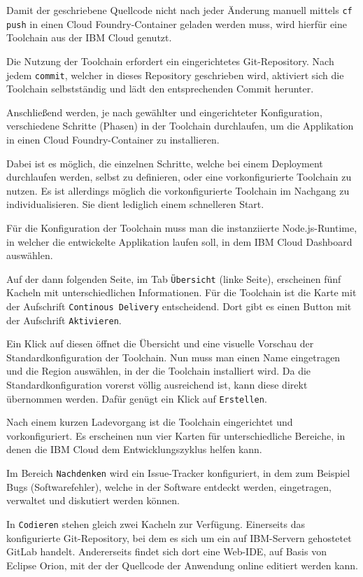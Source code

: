 Damit der geschriebene Quellcode nicht nach jeder Änderung manuell mittels \texttt{cf push} in einen Cloud
Foundry-Container geladen werden muss, wird hierfür eine Toolchain aus der IBM Cloud genutzt.

Die Nutzung der Toolchain erfordert ein eingerichtetes Git-Repository. Nach jedem \texttt{commit}, welcher in dieses
Repository geschrieben wird, aktiviert sich die Toolchain selbstständig und lädt den entsprechenden Commit herunter.

Anschließend werden, je nach gewählter und eingerichteter Konfiguration, verschiedene Schritte (Phasen) in der Toolchain
durchlaufen, um die Applikation in einen Cloud Foundry-Container zu installieren.

Dabei ist es möglich, die einzelnen Schritte, welche bei einem Deployment durchlaufen werden, selbst zu definieren, oder
eine vorkonfigurierte Toolchain zu nutzen. Es ist allerdings möglich die vorkonfigurierte Toolchain im Nachgang zu
individualisieren. Sie dient lediglich einem schnelleren Start.

Für die Konfiguration der Toolchain muss man die instanziierte Node.js-Runtime, in welcher die entwickelte Applikation
laufen soll, in dem IBM Cloud Dashboard auswählen.

Auf der dann folgenden Seite, im Tab \texttt{Übersicht} (linke Seite), erscheinen fünf Kacheln mit unterschiedlichen
Informationen. Für die Toolchain ist die Karte mit der Aufschrift \texttt{Continous Delivery} entscheidend. Dort gibt es
einen Button mit der Aufschrift \texttt{Aktivieren}.

Ein Klick auf diesen öffnet die Übersicht und eine visuelle Vorschau der Standardkonfiguration der Toolchain. Nun muss
man einen Name eingetragen und die Region auswählen, in der die Toolchain installiert wird. Da die Standardkonfiguration
vorerst völlig ausreichend ist, kann diese direkt übernommen werden. Dafür genügt ein Klick auf \texttt{Erstellen}.

Nach einem kurzen Ladevorgang ist die Toolchain eingerichtet und vorkonfiguriert. Es erscheinen nun vier Karten für
unterschiedliche Bereiche, in denen die IBM Cloud dem Entwicklungszyklus helfen kann.

Im Bereich \texttt{Nachdenken} wird ein Issue-Tracker konfiguriert, in dem zum Beispiel Bugs (Softwarefehler), welche
in der Software entdeckt werden, eingetragen, verwaltet und diskutiert werden können.

In \texttt{Codieren} stehen gleich zwei Kacheln zur Verfügung. Einerseits das konfigurierte Git-Repository, bei dem es
sich um ein auf IBM-Servern gehostetet GitLab handelt. Andererseits findet sich dort eine Web-IDE, auf Basis von Eclipse
Orion, mit der der Quellcode der Anwendung online editiert werden kann.

